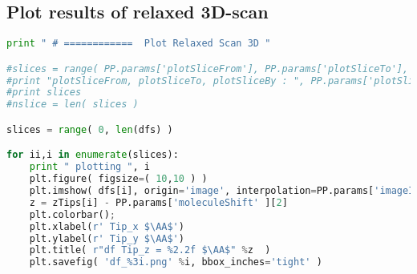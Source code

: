 \subsection{Plot results of relaxed 3D-scan}
\begin{shadedbox}
    \begin{lstlisting}[language=python]
print " # ============  Plot Relaxed Scan 3D "

#slices = range( PP.params['plotSliceFrom'], PP.params['plotSliceTo'], PP.params['plotSliceBy'] )
#print "plotSliceFrom, plotSliceTo, plotSliceBy : ", PP.params['plotSliceFrom'], PP.params['plotSliceTo'], PP.params['plotSliceBy']
#print slices 
#nslice = len( slices )

slices = range( 0, len(dfs) )

for ii,i in enumerate(slices):
    print " plotting ", i
    plt.figure( figsize=( 10,10 ) )
    plt.imshow( dfs[i], origin='image', interpolation=PP.params['imageInterpolation'], cmap=PP.params['colorscale'], extent=extent )
    z = zTips[i] - PP.params['moleculeShift' ][2]
    plt.colorbar();
    plt.xlabel(r' Tip_x $\AA$')
    plt.ylabel(r' Tip_y $\AA$')
    plt.title( r"df Tip_z = %2.2f $\AA$" %z  )
    plt.savefig( 'df_%3i.png' %i, bbox_inches='tight' )

    \end{lstlisting}
\end{shadedbox}


